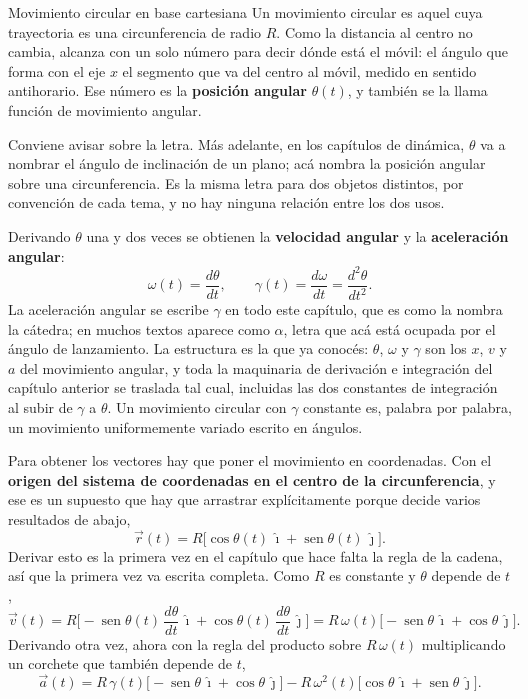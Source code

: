 \documentclass[11pt,openany]{book}
\newcommand{\sen}{\operatorname{sen}}
\begin{document}
\begin{bloque}{Movimiento circular en base cartesiana}
Un movimiento circular es aquel cuya trayectoria es una circunferencia de radio $R$. Como la distancia al centro no cambia, alcanza con un solo número para decir dónde está el móvil: el ángulo que forma con el eje $x$ el segmento que va del centro al móvil, medido en sentido antihorario. Ese número es la \textbf{posición angular} $\theta(t)$, y también se la llama función de movimiento angular.

Conviene avisar sobre la letra. Más adelante, en los capítulos de dinámica, $\theta$ va a nombrar el ángulo de inclinación de un plano; acá nombra la posición angular sobre una circunferencia. Es la misma letra para dos objetos distintos, por convención de cada tema, y no hay ninguna relación entre los dos usos.

Derivando $\theta$ una y dos veces se obtienen la \textbf{velocidad angular} y la \textbf{aceleración angular}:
\[
\omega(t) = \frac{d\theta}{dt}, \qquad \gamma(t) = \frac{d\omega}{dt} = \frac{d^2\theta}{dt^2}.
\]
La aceleración angular se escribe $\gamma$ en todo este capítulo, que es como la nombra la cátedra; en muchos textos aparece como $\alpha$, letra que acá está ocupada por el ángulo de lanzamiento. La estructura es la que ya conocés: $\theta$, $\omega$ y $\gamma$ son los $x$, $v$ y $a$ del movimiento angular, y toda la maquinaria de derivación e integración del capítulo anterior se traslada tal cual, incluidas las dos constantes de integración al subir de $\gamma$ a $\theta$. Un movimiento circular con $\gamma$ constante es, palabra por palabra, un movimiento uniformemente variado escrito en ángulos.

Para obtener los vectores hay que poner el movimiento en coordenadas. Con el \textbf{origen del sistema de coordenadas en el centro de la circunferencia}, y ese es un supuesto que hay que arrastrar explícitamente porque decide varios resultados de abajo,
\[
\vec r(t) = R\big[\cos\theta(t)\,\hat\imath + \sen\theta(t)\,\hat\jmath\big].
\]
Derivar esto es la primera vez en el capítulo que hace falta la regla de la cadena, así que la primera vez va escrita completa. Como $R$ es constante y $\theta$ depende de $t$,
\[
\vec v(t) = R\Big[-\sen\theta(t)\,\frac{d\theta}{dt}\,\hat\imath + \cos\theta(t)\,\frac{d\theta}{dt}\,\hat\jmath\Big]
= R\,\omega(t)\big[-\sen\theta\,\hat\imath + \cos\theta\,\hat\jmath\big].
\]
Derivando otra vez, ahora con la regla del producto sobre $R\,\omega(t)$ multiplicando un corchete que también depende de $t$,
\[
\vec a(t) = R\,\gamma(t)\big[-\sen\theta\,\hat\imath + \cos\theta\,\hat\jmath\big] - R\,\omega^2(t)\big[\cos\theta\,\hat\imath + \sen\theta\,\hat\jmath\big].
\]


\end{bloque}
\end{document}
